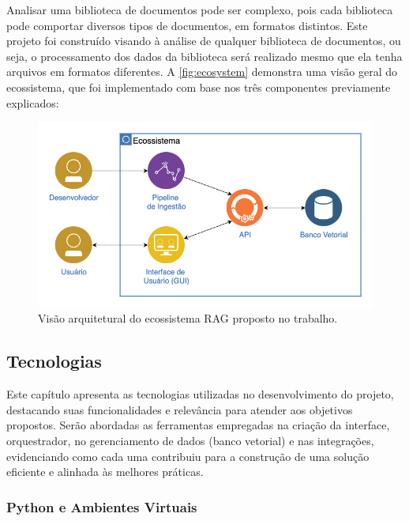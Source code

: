 \documentclass[a4paper, 12pt]{article}
\begin{document}
    Analisar uma biblioteca de documentos pode ser complexo, pois cada biblioteca pode comportar diversos tipos de documentos, em formatos distintos. Este projeto foi construído visando à análise de qualquer biblioteca de documentos, ou seja, o processamento dos dados da biblioteca será realizado mesmo que ela tenha arquivos em formatos diferentes. A \autoref{fig:ecosystem} demonstra uma visão geral do ecossistema, que foi implementado com base nos três componentes previamente explicados:

    \begin{figure}[ht]
        \includegraphics[width=\textwidth,height=0.9\textheight,keepaspectratio]{ecosystem.png}
        \centering
        \caption{Visão arquitetural do ecossistema RAG proposto no trabalho.}
        \centering
        \label{fig:ecosystem}
    \end{figure}

    \subsection{Tecnologias} \label{sec:technologies}

    Este capítulo apresenta as tecnologias utilizadas no desenvolvimento do projeto, destacando suas funcionalidades e relevância para atender aos objetivos propostos. Serão abordadas as ferramentas empregadas na criação da interface, orquestrador, no gerenciamento de dados (banco vetorial) e nas integrações, evidenciando como cada uma contribuiu para a construção de uma solução eficiente e alinhada às melhores práticas.

    \subsubsection{Python e Ambientes Virtuais} \label{sec:python}
    
\end{document}
